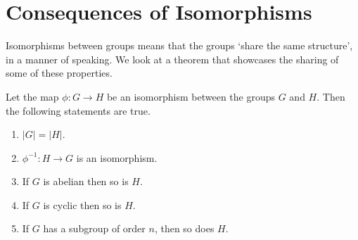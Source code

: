 \section{Consequences of Isomorphisms}
Isomorphisms between groups means that the groups `share the same structure', in a manner of speaking. We look at a theorem that showcases the sharing of some of these properties.
\begin{theorem}\label{thrm-isomorphism-consequences}
    Let the map $\phi: G \to H$ be an isomorphism between the groups $G$ and $H$. Then the following statements are true.
    \begin{enumerate}
        \item $|G| = |H|$.
        \item $\phi^{-1}: H \to G$ is an isomorphism.
        \item If $G$ is abelian then so is $H$.
        \item If $G$ is cyclic then so is $H$.
        \item If $G$ has a subgroup of order $n$, then so does $H$.
    \end{enumerate}
\end{theorem}

